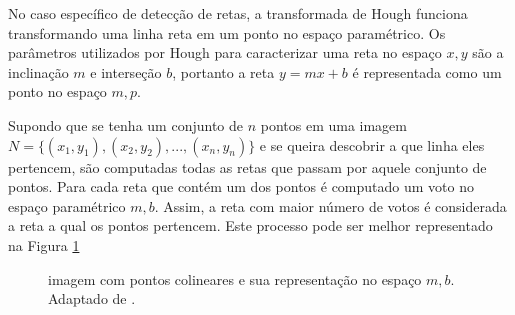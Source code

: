 
No caso específico de detecção de retas, a transformada de Hough funciona transformando uma linha reta em um ponto no espaço paramétrico. Os parâmetros utilizados por Hough para caracterizar uma reta no espaço $x,y$ são a inclinação $m$ e interseção $b$, portanto a reta $y = mx+b$ é representada como um ponto no espaço $m,p$.

Supondo que se tenha um conjunto de $n$ pontos em uma imagem $N = \{(x_1,y_1),(x_2,y_2),...,(x_n,y_n)\}$  e se queira descobrir a que linha eles pertencem, são computadas todas as retas que passam por aquele conjunto de pontos. Para cada reta que contém um dos pontos é computado um voto no espaço paramétrico $m,b$. Assim, a reta com maior número de votos é considerada a reta a qual os pontos pertencem. Este processo pode ser melhor representado na Figura \ref{houghpuro}

\begin{figure}[h]
  \centering
  \hfill
  \caption{imagem com pontos colineares e sua representação no espaço $m,b$. Adaptado de \cite{houghintro01}.}
  \label{houghpuro}
\end{figure}

